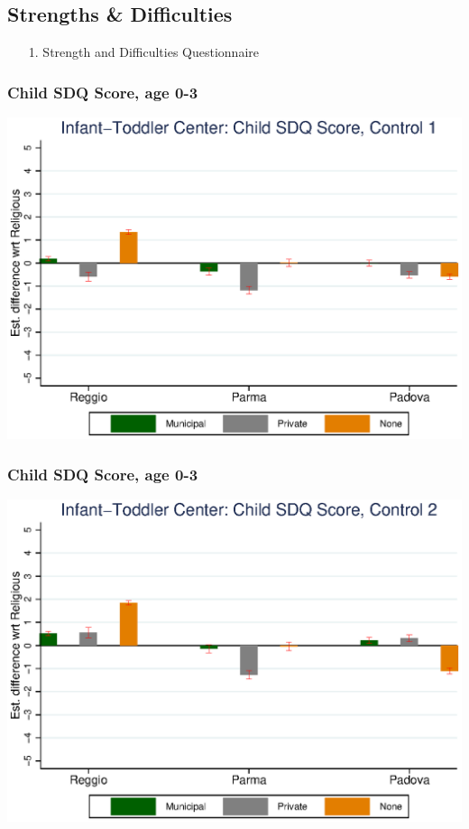 \documentclass{beamer}
\begin{document}
\subsection{Strengths \& Difficulties}
\begin{frame}
\begin{itemize}
	\centering
	\item[1.] Strength and Difficulties Questionnaire
\end{itemize}
\end{frame}
\begin{frame}\frametitle{Child SDQ Score, age 0-3}
\center
\includegraphics[scale=0.7]{../Output/graphs/CS_Asilo_Child_main.eps}
\end{frame}

\begin{frame}\frametitle{Child SDQ Score, age 0-3}
\center
\includegraphics[scale=0.7]{../Output/graphs/CS_Asilo_Child_inter.eps}
\end{frame}
\end{document}
